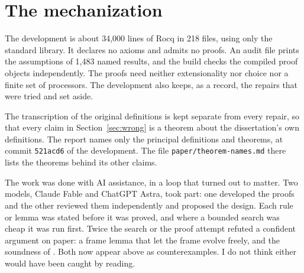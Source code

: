 \section{The mechanization}
\label{sec:mechanization}

The development is about 34,000 lines of Rocq in 218 files, using only the
standard library. It declares no axioms and admits no proofs. An audit file
prints the assumptions of 1,483 named results, and the build checks the
compiled proof objects independently. The proofs need neither
extensionality nor choice nor a finite set of processors. The
development also keeps, as a record, the repairs that were tried and set
aside.

The transcription of the original definitions is kept separate from every
repair, so that every claim in Section~\ref{sec:wrong} is a
theorem about the dissertation's own definitions. The report names only the principal definitions and theorems, at commit
\texttt{521acd6} of the development. The file
\texttt{paper/theorem-names.md} there lists the theorems behind its other
claims.

The work was done with AI assistance, in a loop that turned out to matter.
Two models, Claude Fable and ChatGPT Astra, took part: one developed the
proofs and the other reviewed them independently and proposed the design.
Each rule or lemma was stated before it was proved, and where a bounded
search was cheap it was run first. Twice the search or the proof attempt
refuted a confident argument on paper: a frame lemma that let the frame
evolve freely, and the soundness of . Both now appear above
as counterexamples. I do not think either would have been caught by
reading.

